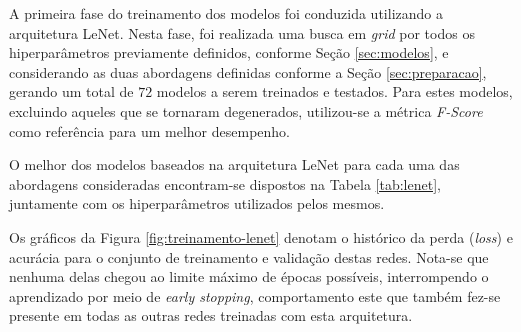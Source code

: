 

A primeira fase do treinamento dos modelos foi conduzida utilizando a arquitetura LeNet. Nesta fase, foi realizada uma busca em \emph{grid} por todos os hiperparâmetros previamente definidos, conforme Seção \ref{sec:modelos}, e considerando as duas abordagens definidas conforme a Seção \ref{sec:preparacao}, gerando um total de $72$ modelos a serem treinados e testados. Para estes modelos, excluindo aqueles que se tornaram degenerados, utilizou-se a métrica \emph{F-Score} como referência para um melhor desempenho.

O melhor dos modelos baseados na arquitetura LeNet para cada uma das abordagens consideradas encontram-se dispostos na Tabela \ref{tab:lenet}, juntamente com os hiperparâmetros utilizados pelos mesmos.

\begin{table}[h]
\centering
\caption{Detalhamento dos melhores resultados obtidos com a arquitetura LeNet.}
\label{tab:lenet}
\end{table}


Os gráficos da Figura \ref{fig:treinamento-lenet} denotam o histórico da perda (\emph{loss}) e acurácia para o conjunto de treinamento e validação destas redes. Nota-se que nenhuma delas chegou ao limite máximo de épocas possíveis, interrompendo o aprendizado por meio de \emph{early stopping}, comportamento este que também fez-se presente em todas as outras redes treinadas com esta arquitetura.

